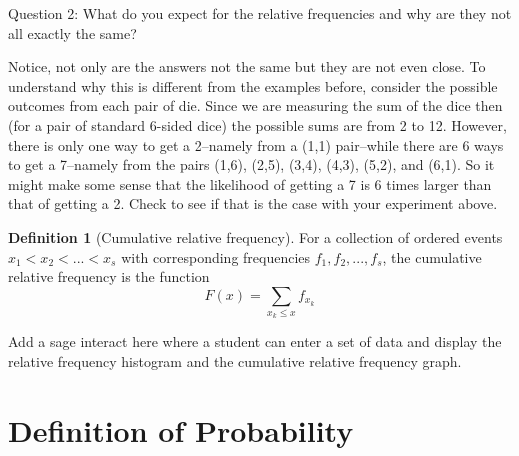 \documentclass[10pt,]{book}
\theoremstyle{plain}
\theoremstyle{definition}
\newtheorem{definition}[theorem]{Definition}
\theoremstyle{definition}
\theoremstyle{definition}
\numberwithin{equation}{section}
\newcommand{\lt}{ < }
\begin{document}
	Question 2: What do you expect for the relative frequencies and why are they not all exactly the same?
\par
Notice, not only are the answers not the same but they are not even close. To understand why this 
	is different from the examples before, consider the possible outcomes from each pair of die. Since we
	are measuring the sum of the dice then (for a pair of standard 6-sided dice) the possible sums are from 
	2 to 12. However, there is only one way to get a 2--namely from a (1,1) pair--while there are 6 ways to get
	a 7--namely from the pairs (1,6), (2,5), (3,4), (4,3), (5,2), and (6,1). So it might make some sense
	that the likelihood of getting a 7 is 6 times larger than that of getting a 2. Check to see if that
	is the case with your experiment above.%
\begin{definition}[{Cumulative relative frequency}]\label{definition-19}
For a collection of ordered events \(x_1 \lt x_2 \lt ... \lt x_s\) with corresponding frequencies \(f_1, f_2, ..., f_s\), the cumulative relative frequency is the function
\begin{equation*}F(x) = \sum_{x_k \le x} f_{x_k}\end{equation*}\end{definition}
\par
Add a sage interact here where a student can enter a set of data and display the relative frequency histogram and the cumulative relative frequency graph.
%
\typeout{************************************************}
\typeout{************************************************}
\section[{Definition of Probability}]{Definition of Probability}\label{section-21}
\typeout{************************************************}
\typeout{************************************************}
\end{document}
